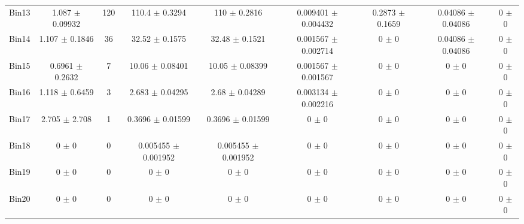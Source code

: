 \begin{tabular}{@{\extracolsep{4pt}}lcccccccc@{}}
     Bin13 & 1.087 $\pm$ 0.09932 & 120 & 110.4 $\pm$ 0.3294 & 110 $\pm$ 0.2816 & 0.009401 $\pm$ 0.004432 & 0.2873 $\pm$ 0.1659 & 0.04086 $\pm$ 0.04086 & 0 $\pm$ 0 \\ 
     Bin14 & 1.107 $\pm$ 0.1846 & 36 & 32.52 $\pm$ 0.1575 & 32.48 $\pm$ 0.1521 & 0.001567 $\pm$ 0.002714 & 0 $\pm$ 0 & 0.04086 $\pm$ 0.04086 & 0 $\pm$ 0 \\ 
     Bin15 & 0.6961 $\pm$ 0.2632 & 7 & 10.06 $\pm$ 0.08401 & 10.05 $\pm$ 0.08399 & 0.001567 $\pm$ 0.001567 & 0 $\pm$ 0 & 0 $\pm$ 0 & 0 $\pm$ 0 \\ 
     Bin16 & 1.118 $\pm$ 0.6459 & 3 & 2.683 $\pm$ 0.04295 & 2.68 $\pm$ 0.04289 & 0.003134 $\pm$ 0.002216 & 0 $\pm$ 0 & 0 $\pm$ 0 & 0 $\pm$ 0 \\ 
     Bin17 & 2.705 $\pm$ 2.708 & 1 & 0.3696 $\pm$ 0.01599 & 0.3696 $\pm$ 0.01599 & 0 $\pm$ 0 & 0 $\pm$ 0 & 0 $\pm$ 0 & 0 $\pm$ 0 \\ 
     Bin18 & 0 $\pm$ 0 & 0 & 0.005455 $\pm$ 0.001952 & 0.005455 $\pm$ 0.001952 & 0 $\pm$ 0 & 0 $\pm$ 0 & 0 $\pm$ 0 & 0 $\pm$ 0 \\ 
     Bin19 & 0 $\pm$ 0 & 0 & 0 $\pm$ 0 & 0 $\pm$ 0 & 0 $\pm$ 0 & 0 $\pm$ 0 & 0 $\pm$ 0 & 0 $\pm$ 0 \\ 
     Bin20 & 0 $\pm$ 0 & 0 & 0 $\pm$ 0 & 0 $\pm$ 0 & 0 $\pm$ 0 & 0 $\pm$ 0 & 0 $\pm$ 0 & 0 $\pm$ 0 \\ 
\hline\hline
  \end{tabular}
